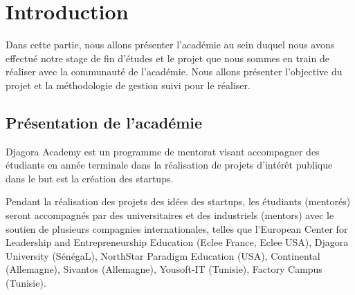 \section{Introduction}


Dans cette partie, nous allons présenter l'académie 
au sein duquel nous avons effectué notre stage de fin d'études et le projet
 que nous sommes en train de réaliser avec la communauté
de l'académie. Nous allons présenter l'objective du projet et la méthodologie de
gestion suivi pour le réaliser.

\subsection{Présentation de l'académie}

Djagora Academy est un programme de mentorat visant accompagner des étudiants
en année terminale dans la réalisation de projets d'intérêt publique dans le but
est la création des startups.

Pendant la réalisation des projets des idées des startups, les étudiants
(mentorés)  seront accompagnés par des universitaires et des industriels
(mentors) avec le soutien de plusieurs compagnies internationales, telles que
l'European Center for Leadership and Entrepreneurship Education (Eclee France,
Eclee USA), Djagora University (SénégaL), NorthStar Paradigm Education (USA),
Continental (Allemagne), Sivantos (Allemagne), Yousoft-IT (Tunisie),
Factory Campus (Tunisie).



